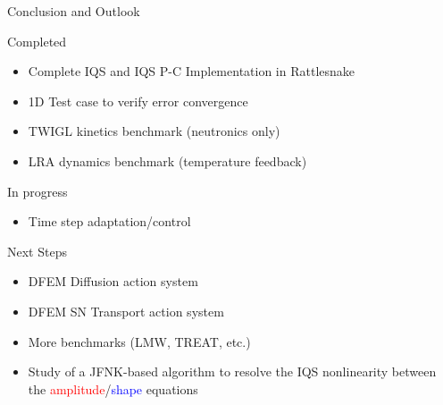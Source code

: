 \documentclass[8pt]{beamer}
\newcommand{\bi}{\begin{itemize}}
\newcommand{\ei}{\end{itemize}}
\newcommand{\tcr}[1]{\textcolor{red}{#1}}
\newcommand{\tcb}[1]{\textcolor{blue}{#1}}
\begin{document}
\begin{frame}{Conclusion and Outlook}

\begin{block}{Completed}
\bi
\item Complete IQS and IQS P-C Implementation in Rattlesnake
\item 1D Test case to verify error convergence
\item TWIGL kinetics  benchmark (neutronics only)
\item LRA dynamics benchmark (temperature feedback)
\ei
\end{block}

\begin{block}{In progress}
\bi
\item Time step adaptation/control
\ei
\end{block}
\begin{block}{Next Steps}
\bi
\item DFEM Diffusion action system
\item DFEM SN Transport action system
\item More benchmarks (LMW, TREAT, etc.)
\item Study of a JFNK-based algorithm to resolve the IQS nonlinearity between the \tcr{amplitude}/\tcb{shape} equations
\ei
\end{block}

\end{frame}
\end{document}
